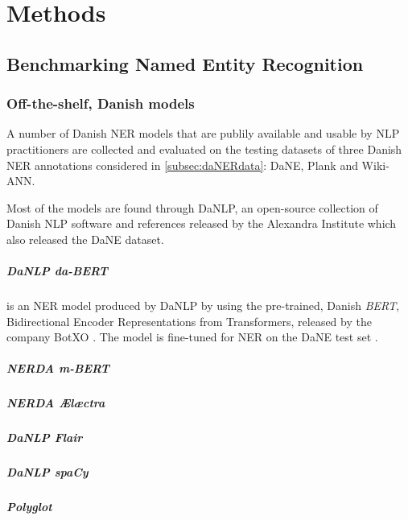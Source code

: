 \documentclass[main.tex]{subfiles}
\begin{document}
\chapter{Methods}

\section{Benchmarking Named Entity Recognition}
\subsection{Off-the-shelf, Danish models}
\label{sec:exidan}
A number of Danish NER models that are publily available and usable by NLP practitioners are collected and evaluated on the testing datasets of three Danish NER annotations considered in \ref{subsec:daNERdata}: DaNE, Plank and Wiki-ANN.

Most of the models are found through DaNLP\footnotemark, an open-source collection of Danish NLP software and references released by the Alexandra Institute which also released the DaNE dataset.
\paragraph{DaNLP da-BERT}
is an NER model produced by DaNLP by using the pre-trained, Danish \emph{BERT}, Bidirectional Encoder Representations from Transformers, \cite{devlin2019bert} released by the company BotXO \cite{botxo2019dabert}.
The model is fine-tuned for NER on the DaNE test set \cite{hvingelby2020dane}.
\paragraph{NERDA m-BERT}
\paragraph{NERDA Ælæctra}
\paragraph{DaNLP Flair}
\paragraph{DaNLP spaCy}
\paragraph{Polyglot}
\end{document}
